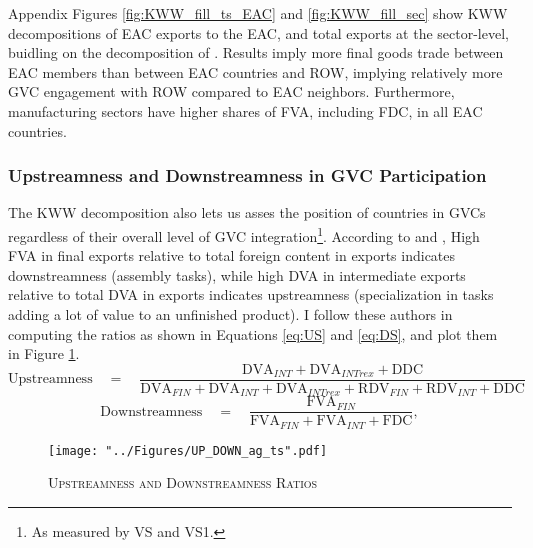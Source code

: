 \documentclass[a4paper]{article}
\begin{document}
Appendix Figures \ref{fig:KWW_fill_ts_EAC} and \ref{fig:KWW_fill_sec} show KWW decompositions of EAC exports to the EAC, and total exports at the sector-level, buidling on the decomposition of \citet{wang2013quantifying}. Results imply more final goods trade between EAC members than between EAC countries and ROW, implying relatively more GVC engagement with ROW compared to EAC neighbors. Furthermore, manufacturing sectors have higher shares of FVA, including FDC, in all EAC countries. 



\subsubsection{Upstreamness and Downstreamness in GVC Participation}


The KWW decomposition also lets us asses the position of countries in GVCs regardless of their overall level of GVC integration\footnote{As measured by VS and VS1.}. According to \citet{Kummritz20162} and \citet{wang2013quantifying}, High FVA in final exports relative to total foreign content in exports indicates downstreamness (assembly tasks), while high DVA in intermediate exports relative to total DVA in exports indicates upstreamness (specialization in tasks adding a lot of value to an unfinished product). I follow these authors in computing the ratios as shown in Equations \ref{eq:US} and \ref{eq:DS}, and plot them in Figure \ref{fig:UP_DOWN_ag_ts}.  
\begin{equation} \label{eq:US}
\text{Upstreamness}\quad =\quad \frac{\text{DVA}_{INT} + \text{DVA}_{INTrex} + \text{DDC}}{\text{DVA}_{FIN} + \text{DVA}_{INT} + \text{DVA}_{INTrex} + \text{RDV}_{FIN} + \text{RDV}_{INT} + \text{DDC}}
\end{equation}
\begin{equation} \label{eq:DS}
\text{Downstreamness}\quad =\quad \frac{\text{FVA}_{FIN}}{\text{FVA}_{FIN} + \text{FVA}_{INT} + \text{FDC}},
\end{equation}
\begin{figure}[h!] \vspace{-0.3cm}
\centering
\caption{\label{fig:UP_DOWN_ag_ts}\textsc{Upstreamness and Downstreamness Ratios}}
\texttt{[image: "../Figures/UP\_DOWN\_ag\_ts".pdf]} %
\end{figure} 
\FloatBarrier 
\end{document}

